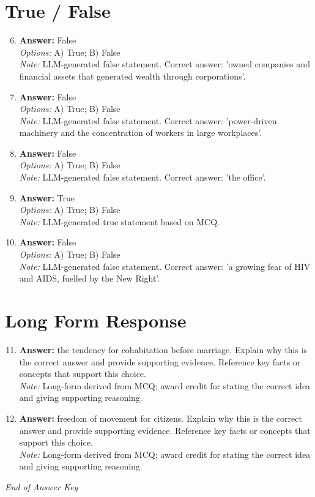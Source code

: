 \documentclass[12pt]{article}
\begin{document}
\section*{True / False}
\begin{enumerate}[label=\arabic*.]
\setcounter{enumi}{5}
\item \textbf{Answer:} False
\\ \textit{Options:} A) True; B) False
\\ \textit{Note:} LLM-generated false statement. Correct answer: 'owned companies and financial assets that generated wealth through corporations'.
\item \textbf{Answer:} False
\\ \textit{Options:} A) True; B) False
\\ \textit{Note:} LLM-generated false statement. Correct answer: 'power-driven machinery and the concentration of workers in large workplaces'.
\item \textbf{Answer:} False
\\ \textit{Options:} A) True; B) False
\\ \textit{Note:} LLM-generated false statement. Correct answer: 'the office'.
\item \textbf{Answer:} True
\\ \textit{Options:} A) True; B) False
\\ \textit{Note:} LLM-generated true statement based on MCQ.
\item \textbf{Answer:} False
\\ \textit{Options:} A) True; B) False
\\ \textit{Note:} LLM-generated false statement. Correct answer: 'a growing fear of HIV and AIDS, fuelled by the New Right'.
\end{enumerate}

\section*{Long Form Response}
\begin{enumerate}[label=\arabic*.]
\setcounter{enumi}{10}
\item \textbf{Answer:} the tendency for cohabitation before marriage. Explain why this is the correct answer and provide supporting evidence. Reference key facts or concepts that support this choice.
\\ \textit{Note:} Long-form derived from MCQ; award credit for stating the correct idea and giving supporting reasoning.
\item \textbf{Answer:} freedom of movement for citizens. Explain why this is the correct answer and provide supporting evidence. Reference key facts or concepts that support this choice.
\\ \textit{Note:} Long-form derived from MCQ; award credit for stating the correct idea and giving supporting reasoning.
\end{enumerate}

\vfill
\noindent\textit{End of Answer Key}
\end{document}
